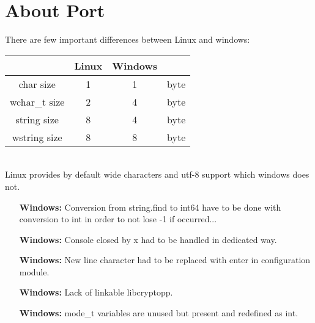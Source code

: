 \hypertarget{AboutPort}{
\section{About Port}
\label{AboutPort}
}

There are few important differences between Linux and windows:\\
\begin{tabular}{|c|c|c|c|}
\hline
  & Linux & Windows & \\ \hline
char size & 1 & 1 & byte\\ \hline
wchar_t size & 2 & 4 & byte\\ \hline
string size & 8 & 4 & byte\\ \hline
wstring size & 8 & 8 & byte\\ \hline
\end{tabular}\\
Linux provides by default wide characters and utf-8 support which windows does not.
\begin{itemize}
\item [\textbf{Windows:}]Conversion from string.find to int64 have to be done with conversion to int in order to not lose -1 if occurred...
\item [\textbf{Windows:}]Console closed by x had to be handled in dedicated way.
\item [\textbf{Windows:}]New line character had to be replaced with enter in configuration module.
\item [\textbf{Windows:}]Lack of linkable libcryptopp.
\item [\textbf{Windows:}]mode\_t variables are unused but present and redefined as int.
\end{itemize}
